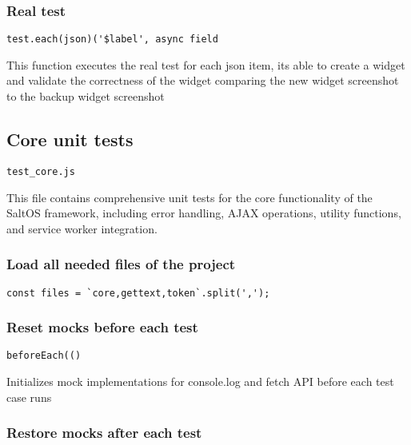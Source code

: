 \documentclass[a4paper]{article}
\begin{document}
\hypertarget{toc40}{}
\subsubsection{Real test}

\begin{lstlisting}
test.each(json)('$label', async field
\end{lstlisting}

This function executes the real test for each json item, its able to
create a widget and validate the correctness of the widget comparing
the new widget screenshot to the backup widget screenshot

\hypertarget{toc41}{}
\subsection{Core unit tests}

\begin{lstlisting}
test_core.js
\end{lstlisting}

This file contains comprehensive unit tests for the core functionality
of the SaltOS framework, including error handling, AJAX operations,
utility functions, and service worker integration.

\hypertarget{toc42}{}
\subsubsection{Load all needed files of the project}

\begin{lstlisting}
const files = `core,gettext,token`.split(',');
\end{lstlisting}

\hypertarget{toc43}{}
\subsubsection{Reset mocks before each test}

\begin{lstlisting}
beforeEach(()
\end{lstlisting}

Initializes mock implementations for console.log and fetch API
before each test case runs

\hypertarget{toc44}{}
\subsubsection{Restore mocks after each test}
\end{document}
